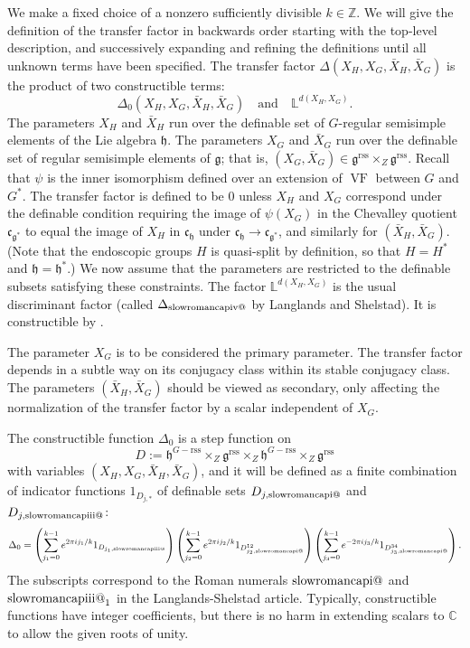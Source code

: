 \documentclass[12pt]{amsart}
\makeatletter
\newcommand*{\rom}[1]{\text{\expandafter\@slowromancap\romannumeral #1@}}
\newcommand{\op}[1]{\operatorname{#1}}
\newcommand{\ring}[1]{{\mathbb #1}}
\def\VF{{\op{VF}}}
\newcommand{\fg}{\mathfrak{g}}
\newcommand{\fc}{\mathfrak{c}}
\newcommand{\fh}{\mathfrak{h}}
\newcommand{\reg}{\mathrm{rss}}
\theoremstyle{plain}
\theoremstyle{definition}
\makeatother
\begin{document}
We make a fixed choice of a nonzero sufficiently divisible
$k\in\ring{Z}$.  We will give the definition of the transfer factor in
backwards order starting with the top-level description, and
successively expanding and refining the definitions until all unknown
terms have been specified.  The transfer factor $\Delta(X_H,X_G,\bar
X_H,\bar X_G)$ is the product of two constructible terms:
\[
\Delta_0(X_H,X_G,\bar
X_H,\bar X_G)\quad\text{and}\quad \ring{L}^{d(X_H,X_G)}.
\]
The parameters $X_H$ and $\bar X_H$ run over the definable set of
$G$-regular semisimple elements of the Lie algebra $\fh$.  The
parameters $X_G$ and $\bar X_G$ run over the definable set of regular
semisimple elements of $\fg$; that is, $(X_G,\bar X_G)\in
\fg^\reg\times_Z\fg^\reg$.  Recall that $\psi$ is the inner
isomorphism defined over an extension of $\VF$ between $G$ and $G^*$.
The transfer factor is defined to be $0$ unless $X_H$ and $X_G$
correspond under the definable condition requiring the image of
$\psi(X_G)$ in the Chevalley quotient $\fc_{\fg^*}$ to equal the image
of $X_H$ in $\fc_{\fh}$ under $\fc_{\fh}\to\fc_{\fg^*}$, and similarly
for $(\bar X_H,\bar X_G)$.  (Note that the endoscopic groups $H$ is
quasi-split by definition, so that $H=H^*$ and $\fh=\fh^*$.)  We now
assume that the parameters are restricted to the definable subsets
satisfying these constraints.  The factor $\ring{L}^{d(X_H,X_G)}$ is
the usual discriminant factor (called $\Delta_{\rom4}$ by Langlands
and Shelstad).  It is constructible by \cite{CHL}.

The parameter $X_G$ is to be considered the primary parameter.  The
transfer factor depends in a subtle way on its conjugacy class within
its stable conjugacy class. The parameters $(\bar X_H,\bar X_G)$
should be viewed as secondary, only affecting the normalization of the
transfer factor by a scalar independent of $X_G$.

The constructible function $\Delta_0$ is a step function on 
\begin{equation}\label{eqn:xfer-domain}
D:= \fh^{G-\reg}\times_Z\fg^\reg\times_Z \fh^{G-\reg}\times_Z\fg^\reg
\end{equation}
with variables $(X_H,X_G,\bar X_H,\bar X_G)$,
and it will
be defined as a finite combination of indicator functions $1_{D_{j,*}}$ of
definable sets $D_{j,{\rom{1}}}$ and $D_{j,\rom{3}}$:
\[
\Delta_0 = 
\left(\sum_{j_1=0}^{k-1} e^{2\pi i j_1/k} 1_{D_{j_1,{\rom{3}}}}\right)
\left(\sum_{j_2=0}^{k-1} e^{2\pi i j_2/k} 1_{D^{12}_{j_2,{\rom{1}}}}\right)
\left(\sum_{j_3=0}^{k-1} e^{-2\pi i j_3/k} 1_{D^{34}_{j_3,{\rom{1}}}}\right).
\]
The
subscripts
correspond to the Roman numerals $\rom1$ and $\rom3_1$ in the
Langlands-Shelstad article.
Typically, constructible functions have integer
coefficients, but there is no harm in extending scalars to $\ring{C}$
to allow the given roots of unity.
\end{document}
